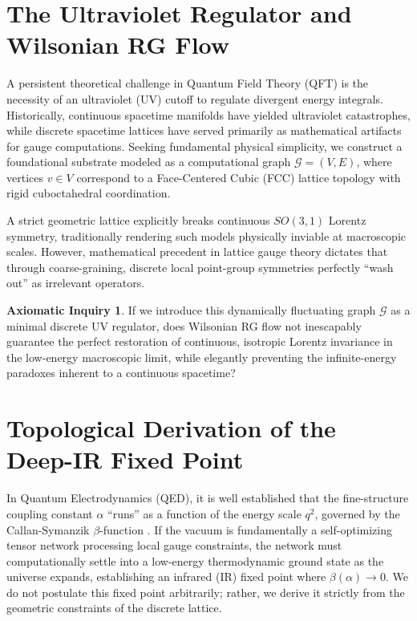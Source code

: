 \documentclass[11pt, letterpaper]{article}
\theoremstyle{definition}
\newtheorem{inquiry}{Axiomatic Inquiry}[section]
\theoremstyle{remark}
\begin{document}
\section{The Ultraviolet Regulator and Wilsonian RG Flow}

A persistent theoretical challenge in Quantum Field Theory (QFT) is the necessity of an ultraviolet (UV) cutoff to regulate divergent energy integrals. Historically, continuous spacetime manifolds have yielded ultraviolet catastrophes, while discrete spacetime lattices have served primarily as mathematical artifacts for gauge computations. Seeking fundamental physical simplicity, we construct a foundational substrate modeled as a computational graph $\mathcal{G} = (V, E)$, where vertices $v \in V$ correspond to a Face-Centered Cubic (FCC) lattice topology with rigid cuboctahedral coordination.

A strict geometric lattice explicitly breaks continuous $SO(3,1)$ Lorentz symmetry, traditionally rendering such models physically inviable at macroscopic scales. However, mathematical precedent in lattice gauge theory dictates that through coarse-graining, discrete local point-group symmetries perfectly ``wash out'' as irrelevant operators.

\begin{inquiry}
If we introduce this dynamically fluctuating graph $\mathcal{G}$ as a minimal discrete UV regulator, does Wilsonian RG flow \cite{Wilson1974} not inescapably guarantee the perfect restoration of continuous, isotropic Lorentz invariance in the low-energy macroscopic limit, while elegantly preventing the infinite-energy paradoxes inherent to a continuous spacetime?
\end{inquiry}

\section{Topological Derivation of the Deep-IR Fixed Point}

In Quantum Electrodynamics (QED), it is well established that the fine-structure coupling constant $\alpha$ ``runs'' as a function of the energy scale $q^2$, governed by the Callan-Symanzik $\beta$-function \cite{Callan1970}. If the vacuum is fundamentally a self-optimizing tensor network processing local gauge constraints, the network must computationally settle into a low-energy thermodynamic ground state as the universe expands, establishing an infrared (IR) fixed point where $\beta(\alpha) \to 0$. We do not postulate this fixed point arbitrarily; rather, we derive it strictly from the geometric constraints of the discrete lattice.
\end{document}
